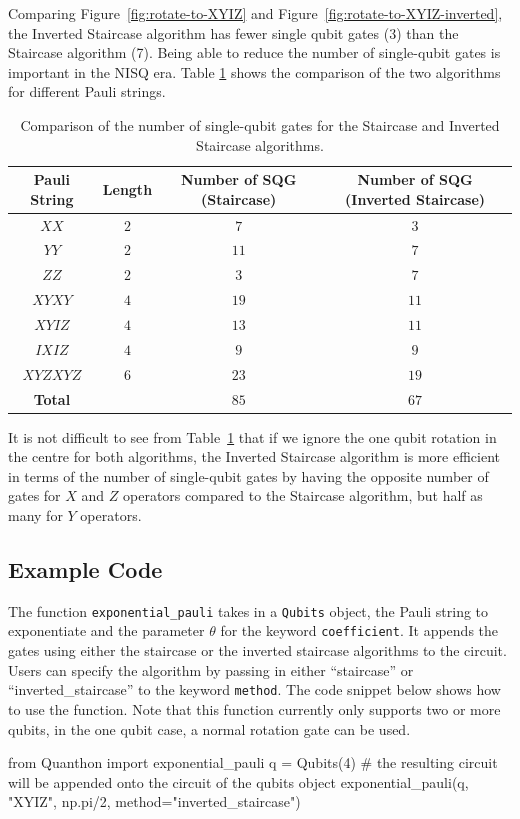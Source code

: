 Comparing Figure~\ref{fig:rotate-to-XYIZ} and Figure~\ref{fig:rotate-to-XYIZ-inverted}, the Inverted Staircase algorithm has fewer single qubit gates (3) than the Staircase algorithm (7). Being able to reduce the number of single-qubit gates is important in the NISQ era. Table \ref{tab:exponential-comparison} shows the comparison of the two algorithms for different Pauli strings.
\begin{table}[ht]
	\centering
	\begin{tabular}{c||c c c}
		\toprule
		Pauli String & Length & Number of SQG (Staircase) & Number of SQG (Inverted Staircase) \\
		\midrule
		$XX$ & $2$ & $7$ & $3$ \\
		$YY$ & $2$ & $11$ & $7$ \\
		$ZZ$ & $2$ & $3$ & $7$ \\
		$XYXY$ & $4$ & $19$ & $11$ \\
		$XYIZ$ & $4$ & $13$ & $11$ \\
		$IXIZ$ & $4$ & $9$ & $9$ \\
		$XYZXYZ$ & $6$ & $23$ & $19$ \\
		\midrule
		\textbf{Total} & & $85$ & $67$ \\
	\bottomrule
	\end{tabular}
	\caption{Comparison of the number of single-qubit gates for the Staircase and Inverted Staircase algorithms.}
	\label{tab:exponential-comparison}
\end{table}
It is not difficult to see from Table~\ref{tab:exponential-comparison} that if we ignore the one qubit rotation in the centre for both algorithms, the Inverted Staircase algorithm is more efficient in terms of the number of single-qubit gates by having the opposite number of gates for $ X $ and $ Z $ operators compared to the Staircase algorithm, but half as many for $ Y $ operators.

\subsection{Example Code}%
\label{sub:exp-example}
The function \texttt{exponential\_pauli} takes in a \texttt{Qubits} object, the Pauli string to exponentiate and the parameter $ \theta $ for the keyword \texttt{coefficient}. It appends the gates using either the staircase or the inverted staircase algorithms to the circuit. Users can specify the algorithm by passing in either ``staircase'' or ``inverted\_staircase'' to the keyword \texttt{method}. The code snippet below shows how to use the function. Note that this function currently only supports two or more qubits, in the one qubit case, a normal rotation gate can be used.
\begin{mycode}
	from Quanthon import exponential_pauli
	q = Qubits(4)
	# the resulting circuit will be appended onto the circuit of the qubits object
	exponential_pauli(q, "XYIZ", np.pi/2, method="inverted_staircase")
\end{mycode}

